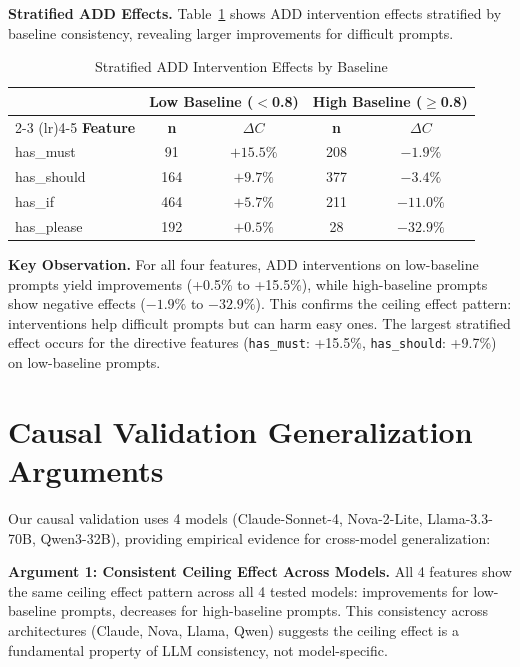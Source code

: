 \documentclass[sigconf,anonymous,review]{acmart}
\begin{document}
\textbf{Stratified ADD Effects.} Table~\ref{tab:stratified_add} shows ADD intervention effects stratified by baseline consistency, revealing larger improvements for difficult prompts.

\begin{table}[h]
\centering
\caption{Stratified ADD Intervention Effects by Baseline}
\label{tab:stratified_add}
\small
\begin{tabular}{@{}lcccc@{}}
\toprule
& \multicolumn{2}{c}{\textbf{Low Baseline ($<$0.8)}} & \multicolumn{2}{c}{\textbf{High Baseline ($\geq$0.8)}} \\
\cmidrule(lr){2-3} \cmidrule(lr){4-5}
\textbf{Feature} & \textbf{n} & \textbf{$\Delta C$} & \textbf{n} & \textbf{$\Delta C$} \\
\midrule
has\_must & 91 & $\mathbf{+15.5\%}$ & 208 & $-1.9\%$ \\
has\_should & 164 & $\mathbf{+9.7\%}$ & 377 & $-3.4\%$ \\
has\_if & 464 & $\mathbf{+5.7\%}$ & 211 & $-11.0\%$ \\
has\_please & 192 & $\mathbf{+0.5\%}$ & 28 & $-32.9\%$ \\
\bottomrule
\end{tabular}
\end{table}

\textbf{Key Observation.} For all four features, ADD interventions on low-baseline prompts yield improvements (+0.5\% to +15.5\%), while high-baseline prompts show negative effects ($-1.9\%$ to $-32.9\%$). This confirms the ceiling effect pattern: interventions help difficult prompts but can harm easy ones. The largest stratified effect occurs for the directive features (\texttt{has\_must}: +15.5\%, \texttt{has\_should}: +9.7\%) on low-baseline prompts.

\section{Causal Validation Generalization Arguments}
\label{app:causal}

Our causal validation uses 4 models (Claude-Sonnet-4, Nova-2-Lite, Llama-3.3-70B, Qwen3-32B), providing empirical evidence for cross-model generalization:

\textbf{Argument 1: Consistent Ceiling Effect Across Models.} All 4 features show the same ceiling effect pattern across all 4 tested models: improvements for low-baseline prompts, decreases for high-baseline prompts. This consistency across architectures (Claude, Nova, Llama, Qwen) suggests the ceiling effect is a fundamental property of LLM consistency, not model-specific.
\end{document}
